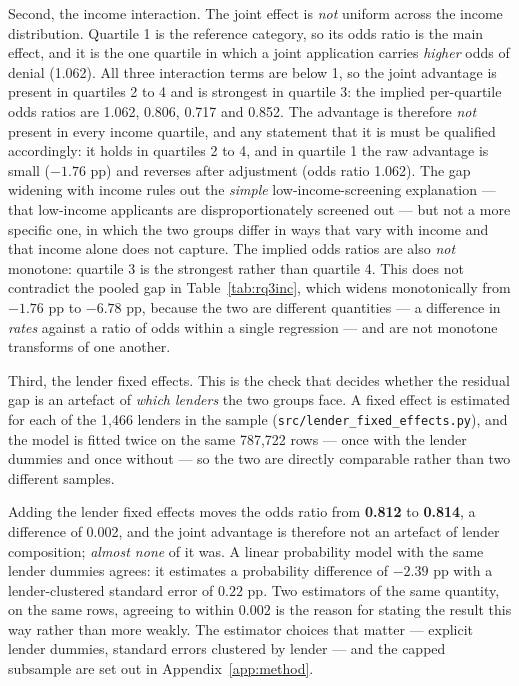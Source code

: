 \documentclass[sigconf,balance=false]{acmart}
\begin{document}
Second, the income interaction. The joint effect is \emph{not} uniform
across the income distribution. Quartile 1 is the reference category, so
its odds ratio is the main effect, and it is the one quartile in which a
joint application carries \emph{higher} odds of denial (1.062). All three
interaction terms are below 1, so the joint advantage is present in
quartiles 2 to 4 and is strongest in quartile 3: the implied per-quartile
odds ratios are 1.062, 0.806, 0.717 and 0.852. The advantage is therefore
\emph{not} present in every income quartile, and any statement that it is
must be qualified accordingly: it holds in quartiles 2 to 4, and in
quartile 1 the raw advantage is small ($-1.76$ pp) and reverses after
adjustment (odds ratio 1.062). The gap widening with income rules out the \emph{simple}
low-income-screening explanation --- that low-income applicants are
disproportionately screened out --- but not a more specific one, in which
the two groups differ in ways that vary with income and that income alone
does not capture. The implied odds ratios are also \emph{not} monotone:
quartile 3 is the strongest rather than quartile 4. This does not
contradict the pooled gap in Table~\ref{tab:rq3inc}, which widens
monotonically from $-1.76$ pp to $-6.78$ pp, because the two are different
quantities --- a difference in \emph{rates} against a ratio of odds within a
single regression --- and are not monotone transforms of one another.

Third, the lender fixed effects. This is the check that decides whether
the residual gap is an artefact of \emph{which lenders} the two groups
face. A fixed effect is estimated for each of the 1{,}466 lenders in the
sample (\texttt{src/lender\_\allowbreak fixed\_\allowbreak effects.py}), and
the model is fitted twice on the same 787{,}722 rows --- once with the
lender dummies and once without --- so the two are directly comparable
rather than two different samples.

Adding the lender fixed effects moves the odds ratio from \textbf{0.812} to
\textbf{0.814}, a difference of 0.002, and the joint advantage is
therefore not an artefact of lender composition; \emph{almost none} of it
was. A linear probability model with the same lender dummies agrees: it
estimates a probability difference of $-2.39$ pp with a lender-clustered
standard error of $0.22$ pp. Two estimators of the same quantity, on the
same rows, agreeing to within $0.002$ is the reason for stating the result
this way rather than more weakly. The estimator choices that matter ---
explicit lender dummies, standard errors clustered by lender --- and the
capped subsample are set out in Appendix~\ref{app:method}.
\end{document}
